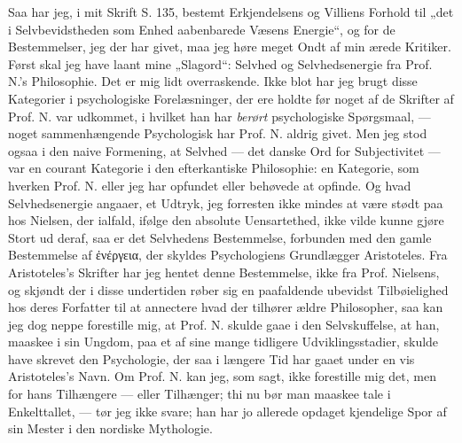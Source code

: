 \documentclass[12pt,a4paper]{book}
\newcommand{\opage}[1]{\marginnote{\footnotesize\textit{[#1]}}}
\begin{document}
Saa har jeg, i mit Skrift S. 135, bestemt Erkjendelsens og Villiens Forhold til
„det i Selvbevidstheden som Enhed aabenbarede Væsens Energie“, og for de
Bestemmelser, jeg der har givet, maa jeg høre meget Ondt af min ærede Kritiker.
Først skal jeg have laant mine „Slagord“: Selvhed og Selvhedsenergie fra
Prof. N.'s Philosophie. Det er mig lidt overraskende. Ikke blot har jeg brugt
disse Kategorier i psychologiske Forelæsninger, der ere holdte før noget af de
Skrifter af Prof. N. var udkommet, i hvilket han har \emph{berørt} psychologiske
Spørgsmaal, --- noget sammenhængende Psychologisk har Prof. N. aldrig givet. Men
jeg stod ogsaa i den naive Formening, at Selvhed --- det danske Ord for
Subjectivitet --- var en courant Kategorie i den efterkantiske Philosophie: en
Kategorie, som hverken Prof. N. eller jeg har opfundet eller behøvede at opfinde.
Og hvad Selvhedsenergie angaaer, et Udtryk, jeg forresten ikke mindes at være
stødt paa hos Nielsen, der ialfald, ifølge den absolute Uensartethed, ikke vilde
kunne gjøre Stort ud
\opage{14} deraf, saa er det Selvhedens Bestemmelse, forbunden med den gamle Bestemmelse af
ἐνέργεια, der skyldes Psychologiens Grundlægger Aristoteles. Fra Aristoteles's
Skrifter har jeg hentet denne Bestemmelse, ikke fra Prof. Nielsens, og skjøndt
der i disse undertiden røber sig en paafaldende ubevidst Tilbøielighed hos deres
Forfatter til at annectere hvad der tilhører ældre Philosopher, saa kan jeg dog
neppe forestille mig, at Prof. N. skulde gaae i den Selvskuffelse, at han,
maaskee i sin Ungdom, paa et af sine mange tidligere Udviklingsstadier, skulde
have skrevet den Psychologie, der saa i længere Tid har gaaet under en vis
Aristoteles's Navn. Om Prof. N. kan jeg, som sagt, ikke forestille mig det, men
for hans Tilhængere --- eller Tilhænger; thi nu bør man maaskee tale i
Enkelttallet, --- tør jeg ikke svare; han har jo allerede opdaget kjendelige Spor
af sin Mester i den nordiske Mythologie.
\end{document}
